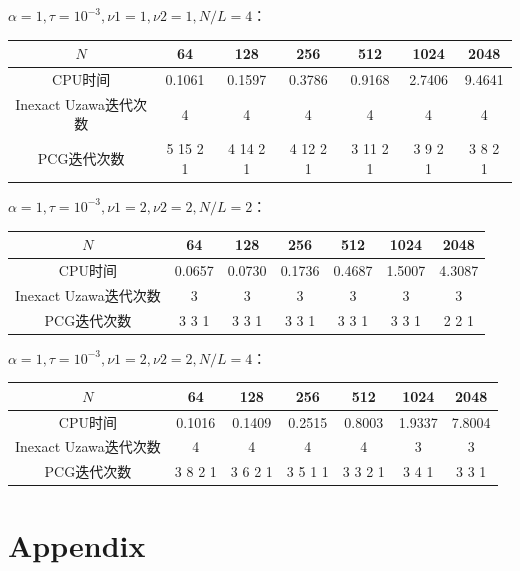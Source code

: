 \documentclass{article}
\begin{document}
$\alpha = 1, \tau = 10^{-3}, \nu1 = 1, \nu2 = 1, N/L = 4$：

\begin{table}[!h]
  \centering
  \begin{tabular}{ccccccc}
    \toprule
    $N$ & 64 & 128 & 256 & 512 & 1024 & 2048 \\
    \midrule
    CPU时间 & 0.1061 & 0.1597 & 0.3786 & 0.9168 & 2.7406 & 9.4641 \\
    Inexact Uzawa迭代次数 & 4 & 4 & 4 & 4 & 4 & 4 \\
    PCG迭代次数 & 5 15 2 1 & 4 14 2 1 & 4 12 2 1 & 3 11 2 1 & 3 9 2 1 & 3 8 2 1 \\
    \bottomrule
  \end{tabular}
\end{table}

$\alpha = 1, \tau = 10^{-3}, \nu1 = 2, \nu2 = 2, N/L = 2$：

\begin{table}[!h]
  \centering
  \begin{tabular}{ccccccc}
    \toprule
    $N$ & 64 & 128 & 256 & 512 & 1024 & 2048 \\
    \midrule
    CPU时间 & 0.0657 & 0.0730 & 0.1736 & 0.4687 & 1.5007 & 4.3087 \\
    Inexact Uzawa迭代次数 & 3 & 3 & 3 & 3 & 3 & 3 \\
    PCG迭代次数 & 3 3 1 & 3 3 1 & 3 3 1 & 3 3 1 & 3 3 1 & 2 2 1 \\
    \bottomrule
  \end{tabular}
\end{table}

$\alpha = 1, \tau = 10^{-3}, \nu1 = 2, \nu2 = 2, N/L = 4$：

\begin{table}[!h]
  \centering
  \begin{tabular}{ccccccc}
    \toprule
    $N$ & 64 & 128 & 256 & 512 & 1024 & 2048 \\
    \midrule
    CPU时间 & 0.1016 & 0.1409 & 0.2515 & 0.8003 & 1.9337 & 7.8004 \\
    Inexact Uzawa迭代次数 & 4 & 4 & 4 & 4 & 3 & 3 \\
    PCG迭代次数 & 3 8 2 1 & 3 6 2 1 & 3 5 1 1 & 3 3 2 1 & 3 4 1 & 3 3 1 \\
    \bottomrule
  \end{tabular}
\end{table}

\section{Appendix}
\end{document}
